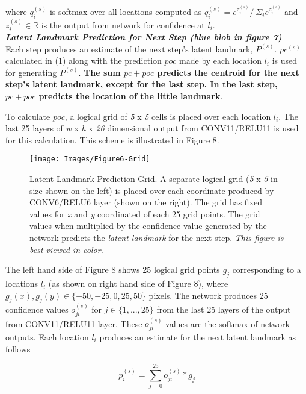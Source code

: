 \documentclass [11pt,letterpaper ,twoside ,openany ]{report}
\begin{document}
    \noindent
    where \(q_i^{(s)}\) is softmax over all locations computed as \(q_i^{(s)} = e^{z_i^{(s)}}/\ \Sigma_i e^{z_i^{(s)}} \) and \(z_i^{(s)} \in  \mathbb{R} \) is the output from network for confidence at \(l_i \).\\

    \noindent
    \textbf{\textit{Latent Landmark Prediction for Next Step (blue blob in figure 7)}}\\
    Each step produces an estimate of the next step's latent landmark, \(P^{(s)}\). \(pc^{(s)} \) calculated in (1) along with the prediction \(poc\) made by each location \(l_i\) is used for generating \(P^{(s)}\). \textbf{The sum \(pc + poc\) predicts the centroid for the next step's latent landmark, except for the last step. In the last step, \(pc + poc\) predicts the location of the little landmark}.

    To calculate \(poc\), a logical grid of \textit {5} x \textit {5} cells is placed over each location \(l_i\). The last 25 layers of \textit {w} x \textit {h} x \textit {26} dimensional output from CONV11/RELU11 is used for this calculation. This scheme is illustrated in Figure 8.

    \begin{figure}[t]
      \centering
      \texttt{[image: Images/Figure6-Grid]}
      \caption{Latent Landmark Prediction Grid. A separate logical grid (\textit{5} x \textit{5} in size shown on the left) is placed over each coordinate produced by CONV6/RELU6 layer (shown on the right). The grid has fixed values for \textit{x} and \textit{y} coordinated of each 25 grid points. The grid values when multiplied by the confidence value generated by the network predicts the \textit{latent landmark} for the next step. \textit{This figure is best viewed in color.}}
      \label{fig:grid}
    \end{figure}

    The left hand side of Figure 8 shows 25 logical grid points \(g_j\) corresponding to a locations \(l_i\) (as shown on right hand side of Figure 8), where \(g_j(x), g_j(y) \in \{-50, -25, 0, 25, 50\} \) pixels. The network produces 25 confidence values \(o_{ji}^{(s)}\) for \(j \in \{1, ..., 25\} \) from the last 25 layers of the output from CONV11/RELU11 layer. These \(o_{ji}^{(s)}\) values are the softmax of network outputs. Each location \(l_i\) produces an estimate for the next latent landmark as follows

    \[      p_i^{(s)} = \displaystyle\sum_{j=0}^{25} o_{ji}^{(s)} * g_j \tag{2} \]
\end{document}
